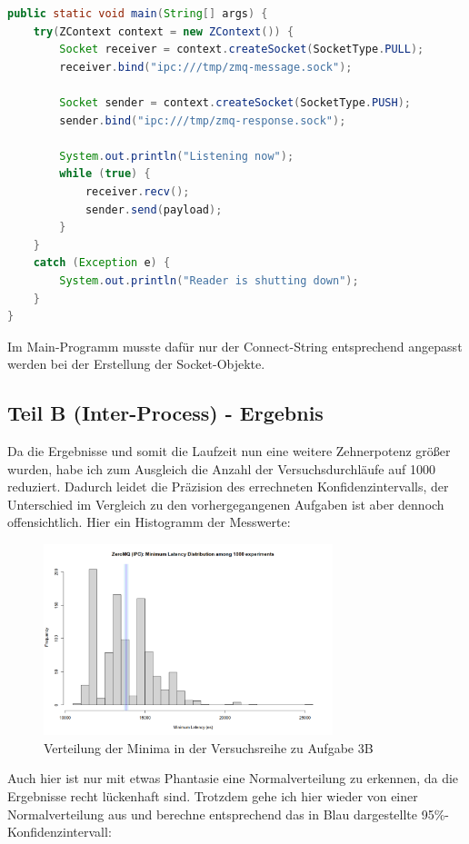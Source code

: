 \documentclass[12pt]{article}
\begin{document}
\begin{lstlisting}[language=java,caption={Antwort im Reader Thread}]
public static void main(String[] args) {
	try(ZContext context = new ZContext()) {
		Socket receiver = context.createSocket(SocketType.PULL);
		receiver.bind("ipc:///tmp/zmq-message.sock");
		
		Socket sender = context.createSocket(SocketType.PUSH);
		sender.bind("ipc:///tmp/zmq-response.sock");
		
		System.out.println("Listening now");
		while (true) {
			receiver.recv();
			sender.send(payload);
		}
	}
	catch (Exception e) {
		System.out.println("Reader is shutting down");
	}
}
\end{lstlisting}


Im Main-Programm musste dafür nur der Connect-String entsprechend angepasst werden bei der Erstellung der Socket-Objekte.

\subsection{Teil B (Inter-Process) - Ergebnis}
Da die Ergebnisse und somit die Laufzeit nun eine weitere Zehnerpotenz größer wurden, habe ich zum Ausgleich die Anzahl der Versuchsdurchläufe auf 1000 reduziert. Dadurch leidet die Präzision des errechneten Konfidenzintervalls, der Unterschied im Vergleich zu den vorhergegangenen Aufgaben ist aber dennoch offensichtlich.
Hier ein Histogramm der Messwerte:

\begin{figure}[H]
	\centering
	\includegraphics[width=0.75\textwidth]{./img/zeromq_ipc}
	\caption{Verteilung der Minima in der Versuchsreihe zu Aufgabe 3B}
	\label{img:zeromq:ipc}
\end{figure}

Auch hier ist nur mit etwas Phantasie eine Normalverteilung zu erkennen, da die Ergebnisse recht lückenhaft sind.
Trotzdem gehe ich hier wieder von einer Normalverteilung aus und berechne entsprechend das in Blau dargestellte 95\%-Konfidenzintervall:
\end{document}

